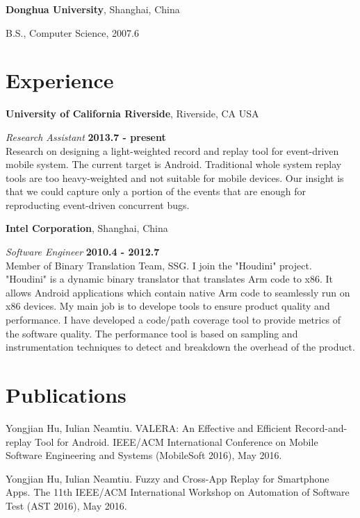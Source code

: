\documentclass[margin,line]{res}
\newenvironment{list1}{
  \begin{list}{\ding{113}}{%
      \setlength{\itemsep}{0in}
      \setlength{\parsep}{0in} \setlength{\parskip}{0in}
      \setlength{\topsep}{0in} \setlength{\partopsep}{0in} 
      \setlength{\leftmargin}{0.17in}}}{\end{list}}
\begin{document}
\begin{resume}
{\bf Donghua University}, Shanghai, China\\
\vspace*{-.1in}
\begin{list1}
\item[] B.S., Computer Science,  2007.6
\end{list1}


\section{\sc Experience}
{\bf University of California Riverside}, Riverside, CA USA

\vspace{-.3cm}
{\em Research Assistant} \hfill {\bf 2013.7 - present}\\
Research on designing a light-weighted record and replay tool for 
event-driven mobile system. The current target is Android. Traditional 
whole system replay tools are too heavy-weighted and not suitable for 
mobile devices. Our insight is that we could capture only a portion 
of the events that are enough for reproducting event-driven concurrent 
bugs.


{\bf Intel Corporation}, Shanghai, China

\vspace{-.3cm}
{\em Software Engineer} \hfill {\bf 2010.4 - 2012.7}\\
Member of Binary Translation Team, SSG. I join the "Houdini" project.
"Houdini" is a dynamic binary translator that translates Arm code to 
x86. It allows Android applications which contain native Arm code to 
seamlessly run on x86 devices. My main job is to develope tools to ensure 
product quality and performance. I have developed a code/path coverage 
tool to provide metrics of the software quality. The performance tool 
is based on sampling and instrumentation techniques to detect and 
breakdown the overhead of the product.


\section{\sc Publications}

Yongjian Hu, Iulian Neamtiu. VALERA: An Effective and Efficient Record-and-replay Tool for Android.
IEEE/ACM International Conference on Mobile Software Engineering and Systems (MobileSoft 2016), May 2016.

Yongjian Hu, Iulian Neamtiu. Fuzzy and Cross-App Replay for Smartphone Apps.
The 11th IEEE/ACM International Workshop on Automation of Software Test (AST 2016), May 2016.


\end{resume}
\end{document}
